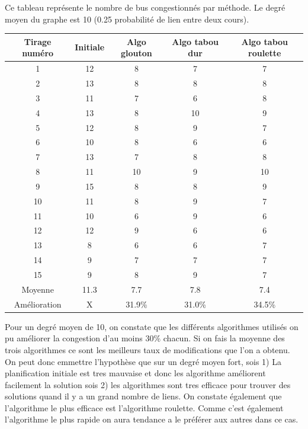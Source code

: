 \documentclass[a4paper,11pt]{article}
\begin{document}
	\newpage
	Ce tableau représente le nombre de bus congestionnés par méthode. Le degré moyen du graphe est 10 (0.25 probabilité de lien entre deux cours).\\ 
	\begin{tabular}{|c|c|c|c|c|}
  		\hline
  		Tirage numéro & Initiale & Algo glouton & Algo tabou dur & Algo tabou roulette\\
  		\hline
  		1 & 12 & 8 & 7 & 7\\
  		\hline
  		2 & 13& 8& 8&8\\
  		\hline
  		3 & 11 & 7 & 6 & 8\\
  		\hline
  		4 & 13 & 8 & 10 & 9\\
  		\hline
  		5 & 12 & 8 & 9 & 7\\
  		\hline
  		6 & 10 & 8 & 6 & 6\\
  		\hline
  		7 & 13 & 7 & 8 & 8\\
  		\hline
  		8 & 11 & 10 & 9 & 10\\
  		\hline
  		9 & 15 & 8 & 8 & 9\\
  		\hline
  		10 & 11 & 8 & 9 & 7\\
  		\hline
  		11 & 10 & 6 & 9 & 6\\
  		\hline
  		12 & 12 & 9 & 6 & 6\\
  		\hline
  		13 & 8 & 6 & 6 & 7\\
  		\hline
  		14 & 9 & 7 & 7 & 7\\
  		\hline
  		15 & 9 & 8 & 9 & 7\\
  		\hline
  		Moyenne  &11.3  &7.7  &7.8 &  7.4\\
  		\hline
  		Amélioration & X & 31.9\% & 31.0\% & 34.5\%\\
  		\hline
	\end{tabular}
	Pour un degré moyen de 10, on constate que les différents algorithmes utilisés on pu améliorer la congestion d'au moins 30\% chacun. Si on fais la moyenne des trois algorithmes ce sont les meilleurs taux de modifications que l'on a obtenu. On peut donc emmettre l'hypothèse que sur un degré moyen fort, sois 1) La planification initiale est tres mauvaise et donc les algorithme améliorent facilement la solution sois 2) les algorithmes sont tres efficace pour trouver des solutions quand il y a un grand nombre de liens. On constate également que l'algorithme le plus efficace est l'algorithme roulette. Comme c'est également l'algorithme le plus rapide on aura tendance a le préférer aux autres dans ce cas.
\end{document}
